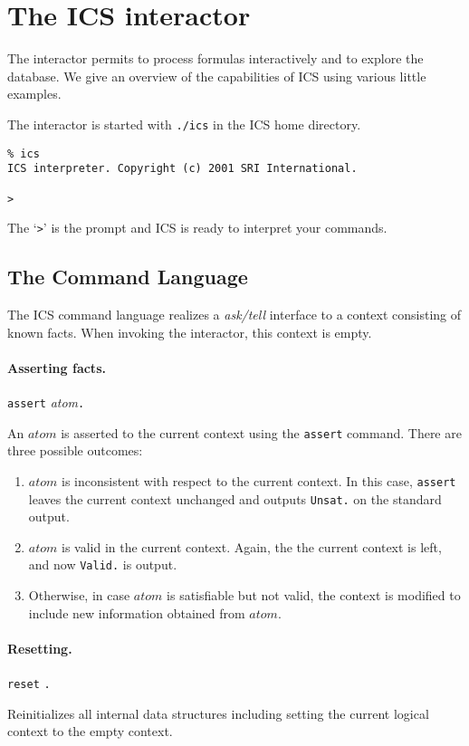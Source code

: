 \documentclass[12pt]{article}
\newcommand{\atom}{\textit{atom}}
\begin{document}
\section{The ICS interactor}\label{sec:interactor}

The interactor permits to process formulas interactively and to explore
the database.  We give an overview of the capabilities of ICS
using various little examples.

The interactor is started with \texttt{./ics} in the ICS home directory.
\begin{verbatim}
% ics
ICS interpreter. Copyright (c) 2001 SRI International.

> 
\end{verbatim}
The `\texttt{>}' is the prompt and ICS is ready to interpret your commands.




\subsection{The Command Language}

The ICS command language realizes a {\em ask/tell} interface to
a context consisting of known facts. When invoking the interactor, 
this context is empty.

\paragraph{Asserting facts.}
  \begin{center}
  \texttt{assert} \atom \texttt{.}
  \end{center}
An $\atom$ is asserted to the current context using the
\texttt{assert} command. There are three possible outcomes:
  \begin{enumerate}
  \item  $\atom$ is inconsistent with respect to the current context.
         In this case, \texttt{assert} leaves the current context
         unchanged and outputs \texttt{Unsat.} on the standard
         output.
  \item  $\atom$ is valid in the current context. Again, the
         the current context is left, and now \texttt{Valid.}
         is output.
  \item  Otherwise, in case $\atom$ is satisfiable but not valid,
         the context is modified to include new information obtained
         from $\atom$.
  \end{enumerate}


\paragraph{Resetting.}
  \begin{center}
  \texttt{reset} \texttt{.}
  \end{center}
Reinitializes all internal data structures including
setting the current logical context to the empty context.
\end{document}
